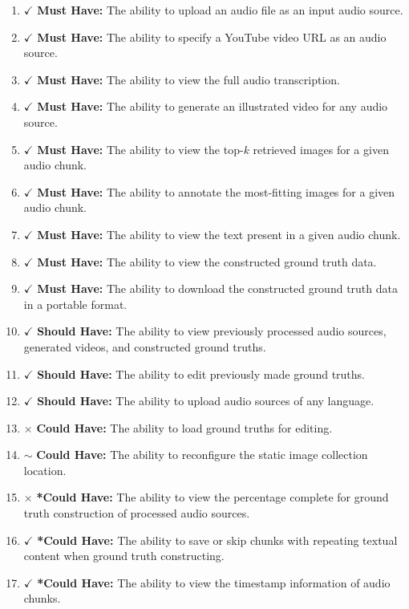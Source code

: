 \documentclass{l4proj}
\begin{document}
\begin{enumerate}
    \color{forestgreen}
    \item $\checkmark$ \textbf{Must Have:} The ability to upload an audio file as an input audio source.
    \item $\checkmark$ \textbf{Must Have:} The ability to specify a YouTube video URL as an audio source.
    \item $\checkmark$ \textbf{Must Have:} The ability to view the full audio transcription.
    \item $\checkmark$ \textbf{Must Have:} The ability to generate an illustrated video for any audio source.
    \item $\checkmark$ \textbf{Must Have:} The ability to view the top-$k$ retrieved images for a given audio chunk.
    \item $\checkmark$ \textbf{Must Have:} The ability to annotate the most-fitting images for a given audio chunk.
    \item $\checkmark$ \textbf{Must Have:} The ability to view the text present in a given audio chunk.
    \item $\checkmark$ \textbf{Must Have:} The ability to view the constructed ground truth data.
    \item $\checkmark$ \textbf{Must Have:} The ability to download the constructed ground truth data in a portable format.
    \item $\checkmark$ \textbf{Should Have:} The ability to view previously processed audio sources, generated videos, and constructed ground truths.
    \item $\checkmark$ \textbf{Should Have:} The ability to edit previously made ground truths.
    \item $\checkmark$ \textbf{Should Have:} The ability to upload audio sources of any language.
    \item {\color{brickred} $\times$ \textbf{Could Have:} The ability to load ground truths for editing.}
    \item {\color{golden} $\sim$ \textbf{Could Have:} The ability to reconfigure the static image collection location.}
    \item {\color{brickred} $\times$ \textbf{*Could Have:} The ability to view the percentage complete for ground truth construction of processed audio sources.}
    \item $\checkmark$ \textbf{*Could Have:} The ability to save or skip chunks with repeating textual content when ground truth constructing.
    \item $\checkmark$ \textbf{*Could Have:} The ability to view the timestamp information of audio chunks.
\end{enumerate}
\end{document}
